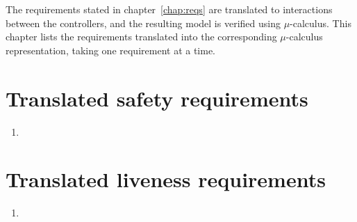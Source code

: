 The requirements stated in chapter~\ref{chap:reqs} are translated to interactions between the controllers, and the resulting model is verified using $\mu$-calculus. This chapter lists the requirements translated into the corresponding $\mu$-calculus representation, taking one requirement at a time.

\section{Translated safety requirements}  

\begin{enumerate}
	\item
\end{enumerate}

\section{Translated liveness requirements}

\begin{enumerate}
	\item 
\end{enumerate}